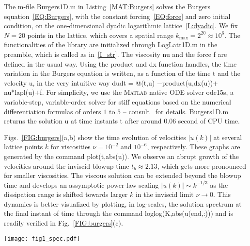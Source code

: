 \documentclass[12pt]{article}
\theoremstyle{definition}
\begin{document}
	The m-file {\mlttfamily Burgers1D.m} in Listing~\ref{MAT:Burgers} solves the Burgers equation~\eqref{EQ:Burgers}, with the constant forcing~\eqref{EQ:force} and zero initial condition, on the one-dimensional dyadic logarithmic lattice~\ref{L:dyadic}.
	We fix $N = 20$ points in the lattice, which covers a spatial range $k_{\max} = 2^{20} \approx 10^6$.
	The functionalities of the library are initialized through {\mlttfamily LogLatt1D.m} in the preamble, which is called as in~\ref{I_str}.
	The viscosity {\mlttfamily nu} and the force {\mlttfamily f} are defined in the usual way.
	Using the {\mlttfamily product} and {\mlttfamily dx} function handles, the time variation in the Burgers equation is written, as a function of the time {\mlttfamily t} and the velocity {\mlttfamily u}, in the very intuitive way {\mlttfamily dudt = @(t,u) $-$product(u,dx(u))$+$nu*lapl(u)$+$f}.
	For simplicity, we use the \textsc{Matlab} native ODE solver {\mlttfamily ode15s}, a variable-step, variable-order solver for stiff equations based on the numerical differentiation formulas of orders $1$ to $5$ -- consult~\cite{shampine1997matlab} for details.
	{\mlttfamily Burgers1D.m} returns the solution {\mlttfamily u} at time instants {\mlttfamily t} after around $0.06$ second of CPU time.
	
	Figs.~\ref{FIG:burgers}(a,b) show the time evolution of velocities $|u(k)|$ at several lattice points $k$ for viscosities $\nu = 10^{-2}$ and $10^{-6}$, respectively.
	These graphs are generated by the command {\mlttfamily plot(t,abs(u))}.
	We observe an abrupt growth of the velocities around the inviscid blowup time $t_b \approx 2.13$, which gets more pronounced for smaller viscosities.
	The viscous solution can be extended beyond the blowup time and develops an assymptotic power-law scaling $|u(k)| \sim k^{-1/3}$ as the dissipation range is shifted towards larger $k$ in the inviscid limit $\nu \to 0$.
	This dynamics is better visualized by plotting, in log-scales, the solution spectrum at the final instant of time through the command {\mlttfamily loglog(K,abs(u(end,:)))} and is readily verified in Fig.~\ref{FIG:burgers}(c).
	
	\begin{figure*}[t]
		\centering
		\texttt{[image: fig1\_spec.pdf]}
		\caption{Solutions of the Burgers equation on the one-dimensional dyadic logarithmic lattice~\ref{L:dyadic}, with the constant forcing~\eqref{EQ:force} and zero intial condition: (a)~and (b) show the time evolution of lattice variables $|u(k)|$, at several points $k$, for viscosities $\nu = 10^{-2}$ and $10^{-6}$, respectively; colors change from blue to red by increasing $|k|$; (c)~solution spectrum $|u(k)|$, in log-scales, at the final instant $t = 5$ for different viscosities $\nu = 10^{-2}, \ 10^{-3}, \ 10^{-4}, \ 10^{-5}, \ 10^{-6}$.}
		\label{FIG:burgers}
	\end{figure*}
	
\end{document}
